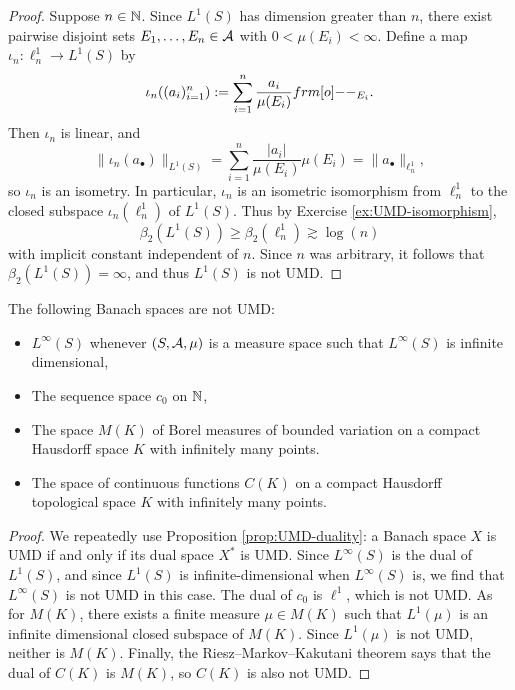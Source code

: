 \begin{proof}
  Suppose $n \in \mathbb{N}$.
  Since $L^1(S)$ has dimension greater than $n$, there exist pairwise disjoint sets $E_{1}, \ldots, E_{n} \in \mathcal{A}$ with $0 < \mu(E_{i}) < \infty$.
  Define a map $\iota_{n} \colon \ell^1_n \to L^1(S)$ by
  \begin{equation*}
    \iota_{n}((a_i)_{i=1}^{n}) := \sum_{i=1}^{n} \frac{a_{i}}{\mu(E_{i})} \1_{E_{i}}.
  \end{equation*}
  Then $\iota_{n}$ is linear, and
  \begin{equation*}
    \|\iota_{n}(a_{\bullet})\|_{L^1(S)} = \sum_{i=1}^{n} \frac{|a_{i}|}{\mu(E_{i})} \mu(E_{i}) = \|a_{\bullet}\|_{\ell^1_n},
  \end{equation*}
  so $\iota_{n}$ is an isometry.
  In particular, $\iota_{n}$ is an isometric isomorphism from $\ell^1_n$ to the closed subspace $\iota_{n}(\ell^1_n)$ of $L^1(S)$.
  Thus by Exercise \ref{ex:UMD-isomorphism},
  \begin{equation*}
    \beta_{2}(L^1(S)) \geq \beta_{2}(\ell^1_n) \gtrsim \log(n)
  \end{equation*}
  with implicit constant independent of $n$.
  Since $n$ was arbitrary, it follows that $\beta_{2}(L^1(S)) = \infty$, and thus $L^1(S)$ is not UMD.
\end{proof}

\begin{cor}
  The following Banach spaces are not UMD:
  \begin{itemize}
  \item $L^\infty(S)$ whenever $(S,\mathcal{A},\mu)$ is a measure space such that $L^\infty(S)$ is infinite dimensional,
  \item The sequence space $c_{0}$ on $\mathbb{N}$,
  \item The space $M(K)$ of Borel measures of bounded variation on a compact Hausdorff space $K$ with infinitely many points.
  \item The space of continuous functions $C(K)$ on a compact Hausdorff topological space $K$ with infinitely many points.
  \end{itemize}
\end{cor}

\begin{proof}
  We repeatedly use Proposition \ref{prop:UMD-duality}: a Banach space $X$ is UMD if and only if its dual space $X^{*}$ is UMD.
  Since $L^\infty(S)$ is the dual of $L^1(S)$, and since $L^1(S)$ is infinite-dimensional when $L^\infty(S)$ is, we find that $L^\infty(S)$ is not UMD in this case.
  The dual of $c_{0}$ is $\ell^1$, which is not UMD.
  As for $M(K)$, there exists a finite measure $\mu \in M(K)$ such that $L^1(\mu)$ is an infinite dimensional closed subspace of $M(K)$.
  Since $L^1(\mu)$ is not UMD, neither is $M(K)$.
  Finally, the Riesz--Markov--Kakutani theorem says that the dual of $C(K)$ is $M(K)$, so $C(K)$ is also not UMD.
\end{proof}

